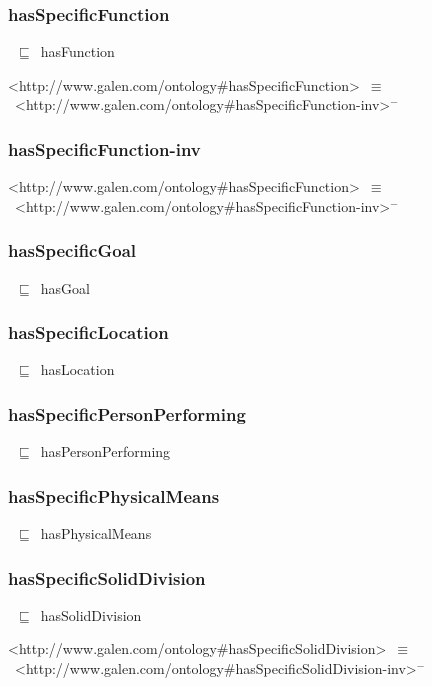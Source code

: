 \documentclass{article}
\begin{document}
\subsubsection*{hasSpecificFunction}

~\ensuremath{\sqsubseteq}~hasFunction

<http://www.galen.com/ontology#hasSpecificFunction>~\ensuremath{\equiv}~<http://www.galen.com/ontology#hasSpecificFunction-inv>\ensuremath{^-}

\subsubsection*{hasSpecificFunction-inv}

<http://www.galen.com/ontology#hasSpecificFunction>~\ensuremath{\equiv}~<http://www.galen.com/ontology#hasSpecificFunction-inv>\ensuremath{^-}

\subsubsection*{hasSpecificGoal}

~\ensuremath{\sqsubseteq}~hasGoal

\subsubsection*{hasSpecificLocation}

~\ensuremath{\sqsubseteq}~hasLocation

\subsubsection*{hasSpecificPersonPerforming}

~\ensuremath{\sqsubseteq}~hasPersonPerforming

\subsubsection*{hasSpecificPhysicalMeans}

~\ensuremath{\sqsubseteq}~hasPhysicalMeans

\subsubsection*{hasSpecificSolidDivision}

~\ensuremath{\sqsubseteq}~hasSolidDivision

<http://www.galen.com/ontology#hasSpecificSolidDivision>~\ensuremath{\equiv}~<http://www.galen.com/ontology#hasSpecificSolidDivision-inv>\ensuremath{^-}
\end{document}
